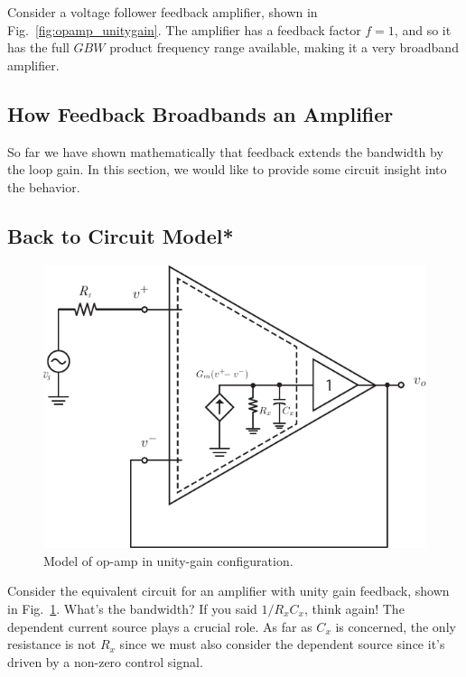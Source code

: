 Consider a voltage follower feedback amplifier, shown in Fig.~\ref{fig:opamp_unitygain}.  The amplifier has a feedback factor $f = 1$, and so it has the full $GBW$ product frequency range available, making it a very broadband amplifier.
 



\subsection{How Feedback Broadbands an Amplifier}

So far we have shown mathematically that feedback extends the bandwidth by the loop gain. In this section, we would like to provide some circuit insight into the behavior.


\subsection{Back to Circuit Model*}

\begin{figure}[tb]
\begin{center}
\includegraphics[scale=1]{opamp_model_fb_unity}
\end{center}
\caption{Model of op-amp in unity-gain configuration.} \label{fig:opamp_model_fb_unity}
\end{figure}

Consider the equivalent circuit for an amplifier with unity gain feedback, shown in Fig.~\ref{fig:opamp_model_fb_unity}.  What's the bandwidth?  If you said $1/R_x C_x$, think again!  The dependent current source plays a crucial role.  As far as $C_x$ is concerned, the only resistance is not $R_x$ since we must also consider the dependent source since it's driven by a non-zero control signal.
 

